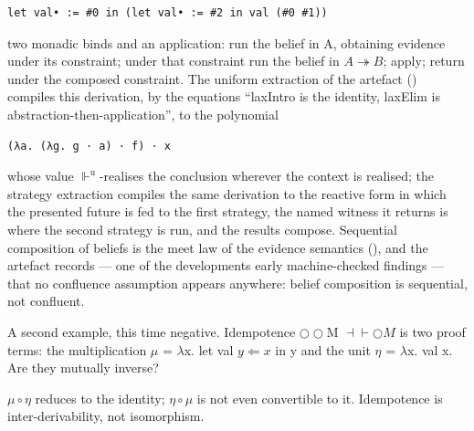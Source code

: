 \begin{lstlisting}
let val• := #0 in (let val• := #2 in val (#0 #1))
\end{lstlisting}

two monadic binds and an application: run the belief in A, obtaining
evidence under its constraint; under that constraint run the belief in
\ensuremath{A \twoheadrightarrow B}; apply; return under the composed constraint. The uniform
extraction of the artefact () compiles this derivation,
by the equations ``laxIntro is the identity, laxElim is
abstraction-then-application'', to the polynomial

\begin{lstlisting}
(λa. (λg. g · a) · f) · x
\end{lstlisting}

whose value \ensuremath{\Vdash^{\mathrm{u}}}-realises the conclusion wherever the context is
realised; the strategy extraction compiles the same derivation to the
reactive form in which the presented future is fed to the first
strategy, the named witness it returns is where the second strategy is
run, and the results compose. Sequential composition of beliefs is the
meet law of the evidence semantics (), and the artefact
records --- one of the development\textquotesingle s early machine-checked
findings --- that no confluence assumption appears anywhere: belief
composition is sequential, not confluent.

A second example, this time negative.
Idempotence \ensuremath{\bigcirc\bigcirc}M \ensuremath{\dashv\vdash \bigcirc M} is two proof terms: the multiplication
\ensuremath{\mu} = \ensuremath{\lambda}x. let val \ensuremath{y \Leftarrow x} in y and the unit \ensuremath{\eta} = \ensuremath{\lambda}x. val x. Are they
mutually inverse?

\begin{proposition}\label{prop:mueta}
\ensuremath{\mu \circ \eta} reduces to the identity; \ensuremath{\eta \circ \mu} is not even convertible
to it. Idempotence is inter-derivability, not isomorphism.
\end{proposition}

